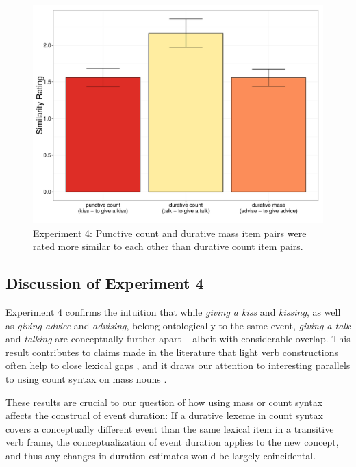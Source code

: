 \documentclass[preprint,12pt,authoryear]{elsarticle}
\begin{document}
\begin{figure}[t]
\centering
\includegraphics[width=\textwidth]{./Figures/Exp4_EventSimilarityBar.pdf}
\caption{Experiment 4: Punctive count and durative mass item pairs were rated more similar to each other than durative count item pairs. }
\label{fig_resSimilarity}
\end{figure}

\subsection{Discussion of Experiment 4}\label{sec_discES}
Experiment 4 confirms the intuition that while \emph{giving a kiss} and \emph{kissing}, as well as \emph{giving advice} and \emph{advising}, belong ontologically to the same event, \emph{giving a talk} and \emph{talking} are conceptually further apart -- albeit with considerable overlap. This result contributes to claims made in the literature that light verb constructions often help to close lexical gaps \citep{miyagawa1989light,Grimshaw1988,glatz2006funktionsverbgefuge}, and it draws our attention to interesting parallels to using count syntax on mass nouns  \citep{gordon1985evaluating,srinivasan2015concepts,Wiese2005}.

These results are crucial to our question of how using mass or count syntax affects the construal of event duration: If a durative lexeme in count syntax covers a conceptually different event than the same lexical item in a transitive verb frame, the conceptualization of event duration applies to the new concept, and thus any changes in duration estimates would be largely coincidental.
\end{document}
